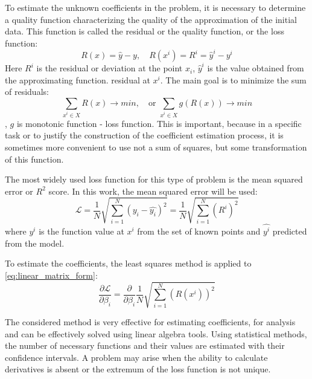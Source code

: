 To estimate the unknown coefficients in the problem, it is necessary to determine a quality function characterizing the quality of the approximation of the initial data. This function is called the residual or the quality function, or the loss function:
\begin{equation}
	R(x) = \hat{y} - y, \quad R(x^i) = R^i = \hat{y}^i - y^i
\end{equation}
Here $R^i$ is the residual or deviation at the point $x_i$, $\hat{y}^i$ is the value obtained from the approximating function.
residual at $x^i$.  The main goal is to minimize the sum of residuals:
\begin{equation*}
	\sum_{x^i \in X} R(x) \rightarrow min, \quad \text{or }  \sum_{x^i \in X} g(R(x)) \rightarrow min
\end{equation*}
, $g$ is monotonic 
function - loss function. This is important, because in a specific task or to justify the construction of the coefficient estimation process, it is sometimes more convenient to use not a sum of squares, but some transformation of this function.

The most widely used loss function for this type of problem is the mean squared error or $R^2$ score. In this work, the mean squared error will be used:
\begin{equation}
	\mathcal{L} = \dfrac{1}{N} \sqrt{\sum_{i = 1}^N \left ( y_i - \hat{y_i} \right )^2} = \dfrac{1}{N} \sqrt{\sum_{i = 1}^N \left ( R^i \right )^2}
	\label{eq:loss}
\end{equation}
where $y^i$ is the function value at $x^i$ from the set of known points and $\hat{y^i}$ predicted from the model.

To estimate the coefficients, the least squares method is applied to \eqref{eq:linear_matrix_form}:
\begin{equation*}
	\dfrac{\partial \mathcal{L}}{\partial \beta_i} = \dfrac{\partial}{\partial \beta_i} \dfrac{1}{N} \sqrt{\sum_{i = 1}^N \left ( R(x^i) \right )^2}
\end{equation*}

The considered method is very effective for estimating coefficients, for analysis and can be effectively solved using linear algebra tools. Using statistical methods, the number of necessary functions and their values are estimated with their confidence intervals. A problem may arise when the ability to calculate derivatives is absent or the extremum of the loss function is not unique.

